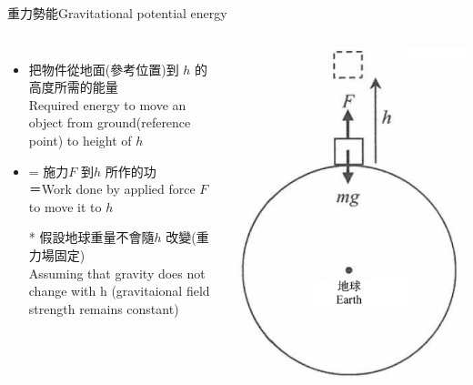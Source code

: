 \documentclass[beamer=true]{standalone}
\begin{document}
\begin{frame}{重力勢能Gravitational potential energy}
    \begin{columns}
        \begin{itemize}
            \item 把物件從地面(參考位置)到 $h$ 的高度所需的能量\\Required energy to move an object from ground(reference point) to height of $h$
            \item = 施力$F$ 到$h$ 所作的功 \\＝Work done by applied force $F$ to move it to $h$
            \item[*] 假設地球重量不會隨$h$ 改變(重力場固定)\\Assuming that gravity does not change with h (gravitaional field strength remains constant)
        \end{itemize}
        {\par\centering
            \includegraphics[width=.8\textwidth]{assets/9272e1df.png}
            \par}
    \end{columns}
\end{frame}
\end{document}
